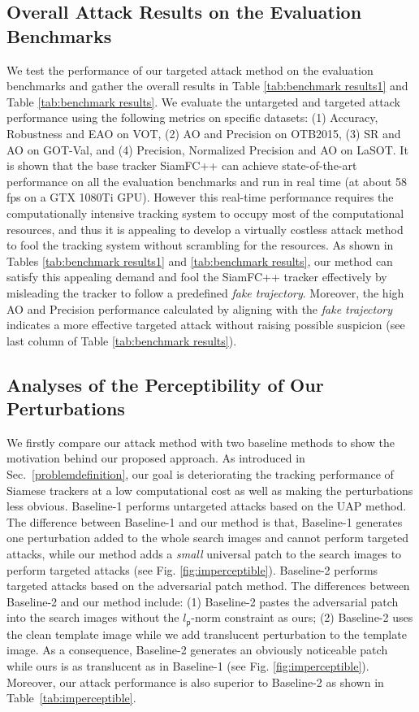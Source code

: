 \documentclass[journal]{IEEEtran}
\renewcommand{\uline}{}
\begin{document}
\subsection{Overall Attack Results on the Evaluation Benchmarks}

We test the performance of our targeted attack method on the evaluation benchmarks and gather the overall results in Table \ref{tab:benchmark results1} and Table \ref{tab:benchmark results}. \uline{We evaluate the untargeted and targeted attack performance using the following metrics on specific datasets: (1) Accuracy, Robustness and EAO on VOT, (2) AO and Precision on OTB2015, (3) SR and AO on GOT-Val, and (4) Precision, Normalized Precision and AO on LaSOT.} It is shown that the base tracker SiamFC++ can achieve state-of-the-art performance on all the evaluation benchmarks and run in real time (at about 58 fps on a GTX 1080Ti GPU). However this real-time performance requires the computationally intensive tracking system to occupy most of the computational resources, and thus it is appealing to develop a virtually costless attack method to fool the tracking system without scrambling for the resources. As shown in Tables \ref{tab:benchmark results1} and \ref{tab:benchmark results}, our method can satisfy this appealing demand and fool the SiamFC++ tracker effectively by misleading the tracker to follow a predefined \textit{fake trajectory}. Moreover, the high AO and Precision performance calculated by aligning with the \textit{fake trajectory} indicates a more effective targeted attack without raising possible suspicion (see last column of Table \ref{tab:benchmark results}).

\subsection{Analyses of the Perceptibility of Our Perturbations}
We firstly compare our attack method with two baseline methods to show the motivation behind our proposed approach. As introduced in Sec.~\ref{problemdefinition}, our goal is deteriorating the tracking performance of Siamese trackers at a low computational cost as well as making the perturbations less obvious.
Baseline-1 performs untargeted attacks based on the UAP \cite{UAP} method. The difference between Baseline-1 and our method is that, Baseline-1 generates \uline{one perturbation} added to the whole search \uline{images} and cannot perform targeted attacks, while our method adds a \textit{small} universal patch to the search \uline{images} to perform targeted attacks (see Fig. \ref{fig:imperceptible}). Baseline-2 performs targeted attacks based on the adversarial patch \cite{patch} method. The differences between Baseline-2 and our method include: (1) Baseline-2 pastes \uline{the} adversarial patch into the search \uline{images} without the $l_{\mathsf{p}}\text{-norm}$ constraint as ours; (2) Baseline-2 uses the clean template image while we add translucent perturbation to the template image. As a consequence, Baseline-2 generates an obviously noticeable patch while ours is as translucent as in Baseline-1 (see Fig. \ref{fig:imperceptible}). Moreover, our attack performance is also superior to Baseline-2 as shown in Table~\ref{tab:imperceptible}\uline{.}
\end{document}
